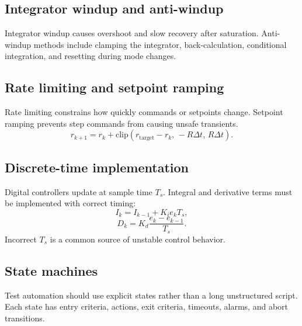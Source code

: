 \documentclass[11pt]{article}
\begin{document}
\subsection{Integrator windup and anti-windup}
Integrator windup causes overshoot and slow recovery after saturation. Anti-windup
methods include clamping the integrator, back-calculation, conditional
integration, and resetting during mode changes.

\subsection{Rate limiting and setpoint ramping}
Rate limiting constrains how quickly commands or setpoints change. Setpoint
ramping prevents step commands from causing unsafe transients.
\[
r_{k+1}=r_k+\mathrm{clip}(r_{\mathrm{target}}-r_k,\,-R\Delta t,\,R\Delta t).
\]

\subsection{Discrete-time implementation}
Digital controllers update at sample time \(T_s\). Integral and derivative terms
must be implemented with correct timing:
\[
I_k = I_{k-1}+K_i e_k T_s,
\]
\[
D_k = K_d\frac{e_k-e_{k-1}}{T_s}.
\]
Incorrect \(T_s\) is a common source of unstable control behavior.

\subsection{State machines}
Test automation should use explicit states rather than a long unstructured
script. Each state has entry criteria, actions, exit criteria, timeouts, alarms,
and abort transitions.

\begin{center}
\end{center}
\end{document}
